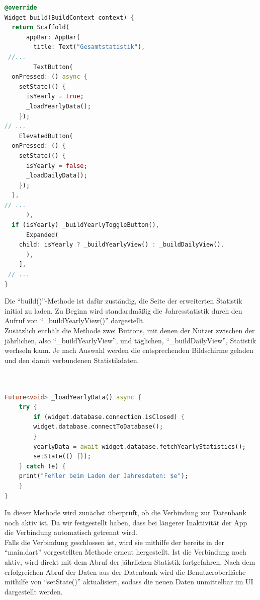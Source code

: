 \documentclass[11pt]{scrartcl}
\begin{document}
    \begin{lstlisting}[language=Dart]
@override
Widget build(BuildContext context) {
  return Scaffold(
      appBar: AppBar(
        title: Text("Gesamtstatistik"),
 //...
        TextButton(
  onPressed: () async {
    setState(() {
      isYearly = true;
      _loadYearlyData();
    });
// ...
    ElevatedButton(
  onPressed: () {
    setState(() {
      isYearly = false;
      _loadDailyData();
    });
  },
// ...
      ),
  if (isYearly) _buildYearlyToggleButton(),
      Expanded(
    child: isYearly ? _buildYearlyView() : _buildDailyView(),
      ),
    ],
 // ...
}
    \end{lstlisting}
    Die \enquote{build()}-Methode ist dafür zuständig, die Seite der erweiterten Statistik initial zu laden.
    Zu Beginn wird standardmäßig die Jahresstatistik durch den Aufruf von \enquote{\_buildYearlyView()} dargestellt. \\
    Zusätzlich enthält die Methode zwei Buttons, mit denen der Nutzer zwischen der jährlichen, also \enquote{\_buildYearlyView}, und täglichen, \enquote{\_buildDailyView}, Statistik wechseln kann.
    Je nach Auswahl werden die entsprechenden Bildschirme geladen und den damit verbundenen Statistikdaten.
    \\ \\ \\
    \begin{lstlisting}[language=Dart]
Future<void> _loadYearlyData() async {
    try {
        if (widget.database.connection.isClosed) {
        widget.database.connectToDatabase();
        }
        yearlyData = await widget.database.fetchYearlyStatistics();
        setState(() {});
    } catch (e) {
    print("Fehler beim Laden der Jahresdaten: $e");
    }
}
    \end{lstlisting}
    In dieser Methode wird zunächst überprüft, ob die Verbindung zur Datenbank noch aktiv ist.
    Da wir festgestellt haben, dass bei längerer Inaktivität der App die Verbindung automatisch getrennt wird. \\
    Falls die Verbindung geschlossen ist, wird sie mithilfe der bereits in der \enquote{main.dart} vorgestellten
    Methode erneut hergestellt.
    Ist die Verbindung noch aktiv, wird direkt mit dem Abruf der jährlichen Statistik fortgefahren.
    Nach dem erfolgreichen Abruf der Daten aus der Datenbank wird die Benutzeroberfläche mithilfe von
    \enquote{setState()} aktualisiert, sodass die neuen Daten unmittelbar im UI dargestellt werden.
\end{document}
